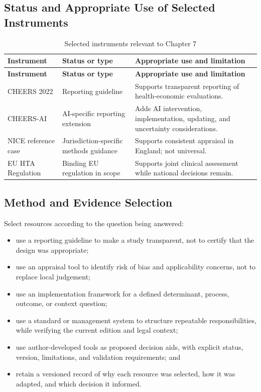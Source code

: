 \subsection{Status and Appropriate Use of Selected Instruments}
\begin{longtable}{@{}p{}p{}p{}@{}}
\caption{Selected instruments relevant to Chapter 7}
\label{tab:comp-ch07-instrument-status}\\
\toprule
\textbf{Instrument} & \textbf{Status or type} & \textbf{Appropriate use and limitation} \\
\midrule
\endfirsthead
\toprule
\textbf{Instrument} & \textbf{Status or type} & \textbf{Appropriate use and limitation} \\
\midrule
\endhead
\bottomrule
\endlastfoot
CHEERS 2022 & Reporting guideline & Supports transparent reporting of health-economic evaluations. \\
CHEERS-AI & AI-specific reporting extension & Adds AI intervention, implementation, updating, and uncertainty considerations. \\
NICE reference case & Jurisdiction-specific methods guidance & Supports consistent appraisal in England; not universal. \\
EU HTA Regulation & Binding EU regulation in scope & Supports joint clinical assessment while national decisions remain. \\
\end{longtable}

\subsection{Method and Evidence Selection}
Select resources according to the question being answered:
\begin{itemize}
 \item use a reporting guideline to make a study transparent, not to certify that the design was appropriate;
 \item use an appraisal tool to identify risk of bias and applicability concerns, not to replace local judgement;
 \item use an implementation framework for a defined determinant, process, outcome, or context question;
 \item use a standard or management system to structure repeatable responsibilities, while verifying the current edition and legal context;
 \item use author-developed tools as proposed decision aids, with explicit status, version, limitations, and validation requirements; and
 \item retain a versioned record of why each resource was selected, how it was adapted, and which decision it informed.
\end{itemize}

